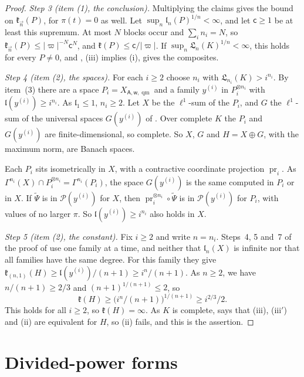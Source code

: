 \documentclass[11pt]{amsart}
\theoremstyle{definition}
\theoremstyle{remark}
\numberwithin{equation}{section}
\newcommand{\abs}[1]{\lvert #1\rvert}
\theoremstyle{plain}
\theoremstyle{definition}
\theoremstyle{plain}
\begin{document}
\begin{proof}
\emph{Step 3 (item (1), the conclusion).} Multiplying the claims gives the bound on $\mathfrak k_{\vec n}(P)$, for $\pi(t)=0$ as well. Let $\sup_n\mathfrak l_n(P)^{1/n}<\infty$, and let $\mathsf c\ge1$ be at least this supremum. At most $N$ blocks occur and $\sum_in_i=N$, so $\mathfrak k_{\vec n}(P)\le\abs\varpi^{-N}\mathsf c^N$, and $\mathfrak k(P)\le\mathsf c/\abs\varpi$. If $\sup_n\mathfrak L_n(K)^{1/n}<\infty$, this holds for every $P\ne0$, and \cite[Theorem~14.22]{I}, (iii) implies (i), gives the composites.

\emph{Step 4 (item (2), the spaces).} For each $i\ge2$ choose $n_i$ with $\mathfrak L_{n_i}(K)>i^{n_i}$. By item~(3) there are a space $P_i=X_{\mathsf A,\mathsf w,\operatorname{qm}}$ and a family $y^{(i)}$ in $P_i^{\otimes n_i}$ with $\mathfrak l(y^{(i)})\ge i^{n_i}$. As $\mathfrak l_1\le1$, $n_i\ge2$. Let $X$ be the $\ell^1$-sum of the $P_i$, and $G$ the $\ell^1$-sum of the universal spaces $G(y^{(i)})$ of \cite[Definition~14.15]{I}. Over complete $K$ the $P_i$ and $G(y^{(i)})$ are finite-dimensional, so complete. So $X$, $G$ and $H=X\oplus G$, with the maximum norm, are Banach spaces.

Each $P_i$ sits isometrically in $X$, with a contractive coordinate projection $\operatorname{pr}_i$. As $\Gamma^{n_i}(X)\cap P_i^{\otimes n_i}=\Gamma^{n_i}(P_i)$, the space $G(y^{(i)})$ is the same computed in $P_i$ or in $X$. If $\tilde\Psi$ is in $\mathcal P(y^{(i)})$ for $X$, then $\operatorname{pr}_i^{\otimes n_i}\circ\tilde\Psi$ is in $\mathcal P(y^{(i)})$ for $P_i$, with values of no larger $\pi$. So $\mathfrak l(y^{(i)})\ge i^{n_i}$ also holds in $X$.

\emph{Step 5 (item (2), the constant).} Fix $i\ge2$ and write $n=n_i$. Steps~4, 5 and~7 of the proof of \cite[Proposition~14.18]{I} use one family at a time, and neither that $\mathfrak l_n(X)$ is infinite nor that all families have the same degree. For this family they give $\mathfrak k_{(n,1)}(H)\ge\mathfrak l(y^{(i)})/(n+1)\ge i^n/(n+1)$. As $n\ge2$, we have $n/(n+1)\ge2/3$ and $(n+1)^{1/(n+1)}\le2$, so
\[
 \mathfrak k(H)\ge\bigl(i^n/(n+1)\bigr)^{1/(n+1)}\ge i^{2/3}/2.
\]
This holds for all $i\ge2$, so $\mathfrak k(H)=\infty$. As $K$ is complete, \cite[Theorem~14.22]{I} says that \textup{(iii)}, \textup{(iii$'$)} and \textup{(ii)} are equivalent for $H$, so \textup{(ii)} fails, and this is the assertion.
\end{proof}
\section{Divided-power forms}\label{dp:sec:forms}
\end{document}
